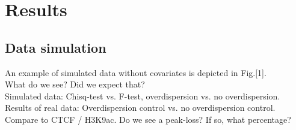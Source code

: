 \section{Results}

\subsection{Data simulation}
An example of simulated data without covariates is depicted in Fig.[1].\\
What do we see? Did we expect that?\\

Simulated data: Chisq-test vs. F-test, overdispersion vs. no overdispersion.\\
Results of real data: Overdispersion control vs. no overdispersion control.\\
Compare to CTCF / H3K9ac. Do we see a peak-loss? If so, what percentage?
  
  
  